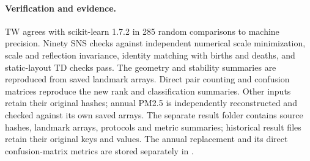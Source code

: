 \paragraph{Verification and evidence.}
TW agrees with scikit-learn 1.7.2 in 285 random comparisons to machine precision. Ninety SNS checks against independent numerical scale minimization, scale and reflection invariance, identity matching with births and deaths, and static-layout TD checks pass. The geometry and stability summaries are reproduced from saved landmark arrays. Direct pair counting and confusion matrices reproduce the new rank and classification summaries. Other inputs retain their original hashes; annual PM2.5 is independently reconstructed and checked against its own saved arrays. The separate result folder  contains source hashes, landmark arrays, protocols and metric summaries; historical result files retain their original keys and values. The annual replacement and its direct confusion-matrix metrics are stored separately in .
